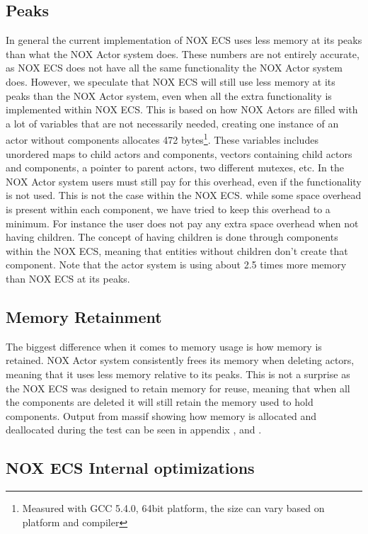 \subsection{Peaks}
In general the current implementation of NOX ECS uses less memory at its peaks than what the NOX Actor system does.
These numbers are not entirely accurate, as NOX ECS does not have all the same functionality the NOX Actor system does.
However, we speculate that NOX ECS will still use less memory at its peaks than the NOX Actor system, even when
all the extra functionality is implemented within NOX ECS.
This is based on how NOX Actors are filled with a lot of variables that are not necessarily needed,
creating one instance of an actor without components allocates 472 bytes\footnote{Measured with GCC 5.4.0, 64bit platform, the size can vary based on platform and compiler}.
These variables includes unordered maps to child actors and components, vectors containing child actors and components,
a pointer to parent actors, two different mutexes, etc.
In the NOX Actor system users must still pay for this overhead, even if the functionality is not used.
This is not the case within the NOX ECS.
while some space overhead is present within each component, we have tried to keep this overhead to a minimum.
For instance the user does not pay any extra space overhead when not having children.
The concept of having children is done through components within the NOX ECS, meaning that entities without children
don't create that component.
Note that the actor system is using about 2.5 times more memory than NOX ECS at its peaks.

\subsection{Memory Retainment}
The biggest difference when it comes to memory usage is how memory is retained.
NOX Actor system consistently frees its memory when deleting actors, meaning that it uses less memory relative to its peaks.
This is not a surprise as the NOX ECS was designed to retain memory for reuse, meaning that when all the components are deleted
it will still retain the memory used to hold components.
Output from massif showing how memory is allocated and deallocated during the test can be seen in appendix ,
and .

\subsection{NOX ECS Internal optimizations}
